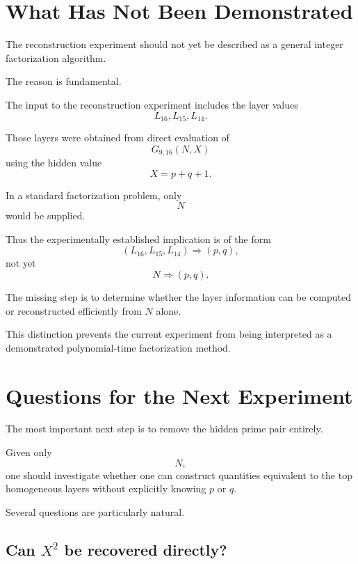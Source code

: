 \documentclass[11pt,a4paper]{article}
\theoremstyle{definition}
\theoremstyle{remark}
\begin{document}
\section{What Has Not Been Demonstrated}

The reconstruction experiment should not yet be described as a general
integer factorization algorithm.

The reason is fundamental.

The input to the reconstruction experiment includes the layer values
\[
L_{16},L_{15},L_{14}.
\]

Those layers were obtained from direct evaluation of
\[
G_{9,16}(N,X)
\]
using the hidden value
\[
X=p+q+1.
\]

In a standard factorization problem, only
\[
N
\]
would be supplied.

Thus the experimentally established implication is of the form
\begin{equation}
(L_{16},L_{15},L_{14})
\Longrightarrow
(p,q),
\end{equation}
not yet
\begin{equation}
N
\Longrightarrow
(p,q).
\end{equation}

The missing step is to determine whether the layer information can be
computed or reconstructed efficiently from $N$ alone.

This distinction prevents the current experiment from being interpreted as
a demonstrated polynomial-time factorization method.

\section{Questions for the Next Experiment}

The most important next step is to remove the hidden prime pair entirely.

Given only
\[
N,
\]
one should investigate whether one can construct quantities equivalent to
the top homogeneous layers without explicitly knowing $p$ or $q$.

Several questions are particularly natural.

\subsection{Can $X^2$ be recovered directly?}
\end{document}
